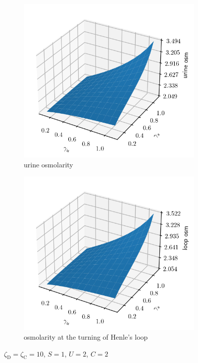 \documentclass{article}
\numberwithin{equation}{section} %
\begin{document}
\begin{figure}
\begin{subfigure}{0.5\textwidth}
        \includegraphics[width=\linewidth]{../results/7-20-2023/urine_osm.png}
        \caption{urine osmolarity}
        \label{fig:urine_osm}
    \end{subfigure}
    \begin{subfigure}{0.5\textwidth}
        \centering
        \includegraphics[width=\linewidth]{../results/7-20-2023/loop_osm.png}
        \caption{osmolarity at the turning of Henle's loop}
        \label{fig:loop_osm}
    \end{subfigure}
    \caption{$\zeta_\mathrm{D} = \zeta_\mathrm{C} = 10$, $S = 1$, $U = 2$, $C = 2$}
    \label{fig:pap_osm}
\end{figure}
\end{document}
